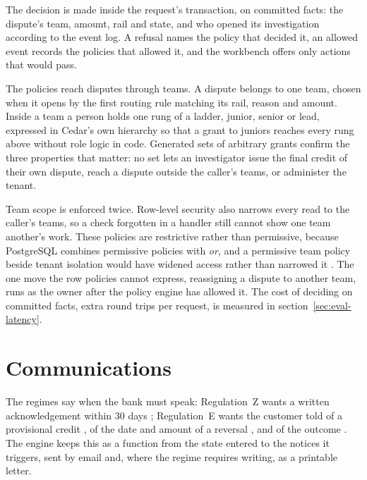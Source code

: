 The decision is made inside the request's transaction, on committed facts: the dispute's team, amount, rail and
state, and who opened its investigation according to the event log. A refusal names the policy that decided it,
an allowed event records the policies that allowed it, and the workbench offers only actions that would pass.

\label{sec:design-teams}
The policies reach disputes through teams. A dispute belongs to one team, chosen when it opens by the first routing rule matching its rail, reason and
amount. Inside a team a person holds one rung of a ladder, junior, senior or lead, expressed in Cedar's own
hierarchy so that a grant to juniors reaches every rung above without role logic in code. Generated sets of arbitrary grants confirm the three properties that matter: no set lets an investigator issue
the final credit of their own dispute, reach a dispute outside the caller's teams, or administer the tenant.

Team scope is enforced twice. Row-level security also narrows every read to the caller's teams, so a check
forgotten in a handler still cannot show one team another's work. These policies are restrictive rather than
permissive, because PostgreSQL combines permissive policies with \emph{or}, and a permissive team policy beside
tenant isolation would have widened access rather than narrowed it \cite{pgrls}. The one move the row policies cannot express, reassigning a dispute to another team, runs as the owner after the
policy engine has allowed it. The cost of deciding on
committed facts, extra round trips per request, is measured in section~\ref{sec:eval-latency}.

\section{Communications}
\label{sec:design-communications}

The regimes say when the bank must speak: Regulation~Z wants a written acknowledgement within 30 days
\cite[\S~1026.13(c)(1)]{regz}; Regulation~E wants the customer told of a provisional credit
\cite[\S~1005.11(c)(2)(ii)]{rege}, of the date and amount of a reversal \cite[\S~1005.11(d)(2)]{rege}, and of the
outcome \cite[\S~1005.11(d)(1)]{rege}. The engine keeps this as a function from the state entered to the notices it
triggers, sent by email and, where the regime requires writing, as a printable letter.

